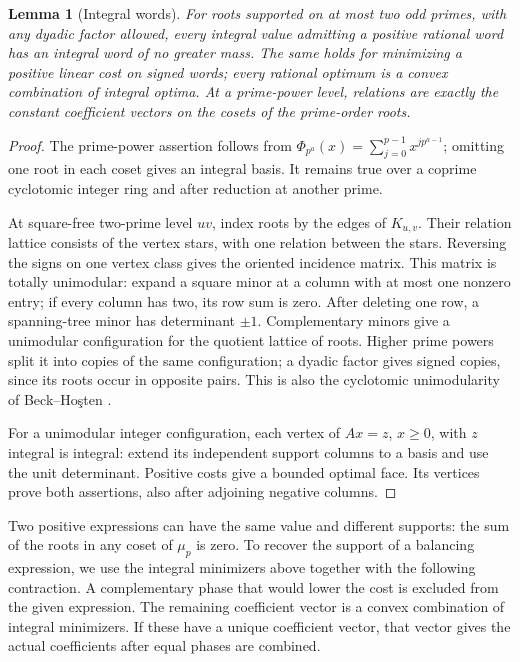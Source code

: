 \documentclass[11pt,a4paper]{article}
\numberwithin{equation}{section}
\newtheorem{lemma}[theorem]{Lemma}
\begin{document}
\begin{lemma}[Integral words]\label{word:integrality}
For roots supported on at most two odd primes, with any dyadic
factor allowed, every integral value admitting a positive rational
word has an integral word of no greater mass. The same holds for
minimizing a positive linear cost on signed words; every rational
optimum is a convex combination of integral optima.
At a prime-power level, relations are exactly the constant
coefficient vectors on the cosets of the prime-order roots.
\end{lemma}
\begin{proof}
The prime-power assertion follows from
$\Phi_{p^a}(x)=\sum_{j=0}^{p-1}x^{jp^{a-1}}$; omitting one
root in each coset gives an integral basis. It remains true over
a coprime cyclotomic integer ring and after reduction at another
prime.

At square-free two-prime level $uv$, index roots by the edges of
$K_{u,v}$. Their relation lattice consists of the vertex stars,
with one relation between the stars. Reversing the signs on one
vertex class gives the oriented incidence matrix. This matrix is
totally unimodular: expand a square minor at a column with at most
one nonzero entry; if every column has two, its row sum is zero.
After deleting one row, a spanning-tree minor has determinant
$\pm1$. Complementary minors give a unimodular configuration for
the quotient lattice of roots. Higher prime powers split it into
copies of the same configuration; a dyadic factor gives signed
copies, since its roots occur in opposite pairs. This is also the
cyclotomic unimodularity of Beck--Ho\c{s}ten
\cite[Theorem~13]{BH}.

For a unimodular integer configuration, each vertex of $Ax=z$,
$x\ge0$, with $z$ integral is integral: extend its independent
support columns to a basis and use the unit determinant.
Positive costs give a bounded optimal face. Its vertices prove
both assertions, also after adjoining negative columns.
\end{proof}

Two positive expressions can have the same value and different supports:
the sum of the roots in any coset of $\mu_p$ is zero. To recover the support of a balancing expression, we use the integral
minimizers above together with the following contraction. A complementary
phase that would lower the cost is excluded from the given expression.
The remaining coefficient vector is a convex combination of integral
minimizers. If these have a unique coefficient vector, that vector gives
the actual coefficients after equal phases are combined.
\end{document}
